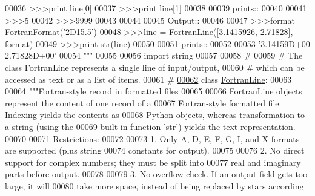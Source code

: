 \begin{DoxyCode}
00036 \textcolor{stringliteral}{    >>>print line[0]}
00037 \textcolor{stringliteral}{    >>>print line[1]}
00038 \textcolor{stringliteral}{}
00039 \textcolor{stringliteral}{  prints::}
00040 \textcolor{stringliteral}{}
00041 \textcolor{stringliteral}{    >>>5}
00042 \textcolor{stringliteral}{    >>>9999}
00043 \textcolor{stringliteral}{}
00044 \textcolor{stringliteral}{}
00045 \textcolor{stringliteral}{  Output::}
00046 \textcolor{stringliteral}{}
00047 \textcolor{stringliteral}{    >>>format = FortranFormat('2D15.5')}
00048 \textcolor{stringliteral}{    >>>line = FortranLine([3.1415926, 2.71828], format)}
00049 \textcolor{stringliteral}{    >>>print str(line)}
00050 \textcolor{stringliteral}{}
00051 \textcolor{stringliteral}{  prints::}
00052 \textcolor{stringliteral}{}
00053 \textcolor{stringliteral}{    '3.14159D+00    2.71828D+00'}
00054 \textcolor{stringliteral}{"""}
00055 
00056 \textcolor{keyword}{import} string
00057 
00058 \textcolor{comment}{#}
00059 \textcolor{comment}{# The class FortranLine represents a single line of input/output,}
00060 \textcolor{comment}{# which can be accessed as text or as a list of items.}
00061 \textcolor{comment}{#}
\hypertarget{_fortran_format_8py_source_l00062}{}\hyperlink{classpyneb_1_1utils_1_1_fortran_format_1_1_fortran_line}{00062} \textcolor{keyword}{class }\hyperlink{classpyneb_1_1utils_1_1_fortran_format_1_1_fortran_line}{FortranLine}:
00063 
00064     \textcolor{stringliteral}{"""Fortran-style record in formatted files}
00065 \textcolor{stringliteral}{}
00066 \textcolor{stringliteral}{    FortranLine objects represent the content of one record of a}
00067 \textcolor{stringliteral}{    Fortran-style formatted file. Indexing yields the contents as}
00068 \textcolor{stringliteral}{    Python objects, whereas transformation to a string (using the}
00069 \textcolor{stringliteral}{    built-in function 'str') yields the text representation.}
00070 \textcolor{stringliteral}{}
00071 \textcolor{stringliteral}{    Restrictions:}
00072 \textcolor{stringliteral}{}
00073 \textcolor{stringliteral}{      1. Only A, D, E, F, G, I, and X formats are supported (plus string}
00074 \textcolor{stringliteral}{         constants for output).}
00075 \textcolor{stringliteral}{}
00076 \textcolor{stringliteral}{      2. No direct support for complex numbers; they must be split into}
00077 \textcolor{stringliteral}{         real and imaginary parts before output.}
00078 \textcolor{stringliteral}{}
00079 \textcolor{stringliteral}{      3. No overflow check. If an output field gets too large, it will}
00080 \textcolor{stringliteral}{         take more space, instead of being replaced by stars according}

\end{DoxyCode}
